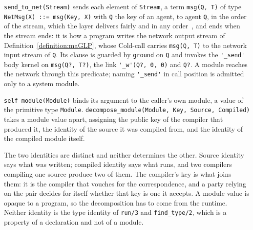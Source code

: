 \verb|send_to_net(Stream)| sends each element of \verb|Stream|, a term \verb|msg(Q, T)| of type \verb|NetMsg(X) ::= msg(Key, X)| with \verb|Q| the key of an agent, to agent \verb|Q|, in the order of the stream, which the layer delivers fairly and in any order~\cite{bachar2026networking}, and ends when the stream ends: it is how a program writes the network output stream of Definition~\ref{definition:maGLP}, whose Cold-call carries \verb|msg(Q, T)| to the network input stream of \verb|Q|. Its clause is guarded by \verb|ground| on \verb|Q| and invokes the \verb|'_send'| body kernel on \verb|msg(Q?, T?)|, the link \verb|'_w'(Q?, 0, 0)| and \verb|Q?|. A module reaches the network through this predicate; naming \verb|'_send'| in call position is admitted only to a system module.

\verb|self_module(Module)| binds its argument to the caller's own module, a value of the primitive type \verb|Module|. \verb|decompose_module(Module, Key, Source, Compiled)| takes a module value apart, assigning the public key of the compiler that produced it, the identity of the source it was compiled from, and the identity of the compiled module itself.

The two identities are distinct and neither determines the other. Source identity says what was written; compiled identity says what runs, and two compilers compiling one source produce two of them. The compiler's key is what joins them: it is the compiler that vouches for the correspondence, and a party relying on the pair decides for itself whether that key is one it accepts. A module value is opaque to a program, so the decomposition has to come from the runtime. Neither identity is the type identity of \verb|run/3| and \verb|find_type/2|, which is a property of a declaration and not of a module.

